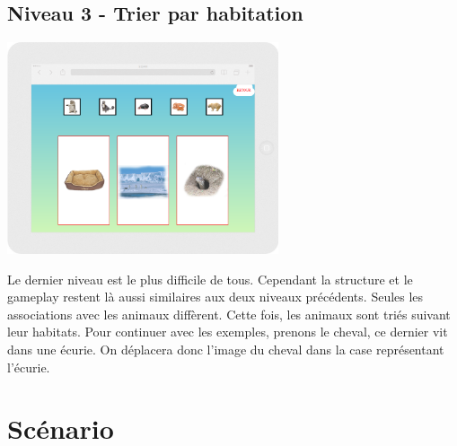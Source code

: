 \documentclass{article}
\begin{document}
\subsection{Niveau 3 - Trier par habitation}
\vspace{0.5cm}
\begin{center}
\includegraphics[width=0.6\textwidth]{page4}
\end{center}
\vspace{0.5cm}
\hspace*{0.6cm}Le dernier niveau est le plus difficile de tous. Cependant la structure et le gameplay restent là aussi similaires aux deux niveaux précédents. Seules les associations avec les animaux diffèrent. Cette fois, les animaux sont triés suivant leur habitats. Pour continuer avec les exemples, prenons le cheval, ce dernier vit dans une écurie. On déplacera donc l'image du cheval dans la case représentant l'écurie.
    
\section{Scénario}
\end{document}
